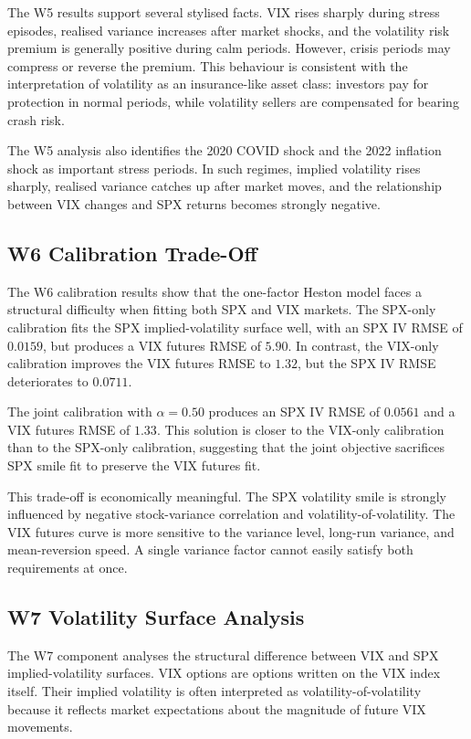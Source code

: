 The W5 results support several stylised facts. VIX rises sharply during stress episodes, realised variance increases after market shocks, and the volatility risk premium is generally positive during calm periods. However, crisis periods may compress or reverse the premium. This behaviour is consistent with the interpretation of volatility as an insurance-like asset class: investors pay for protection in normal periods, while volatility sellers are compensated for bearing crash risk.

The W5 analysis also identifies the 2020 COVID shock and the 2022 inflation shock as important stress periods. In such regimes, implied volatility rises sharply, realised variance catches up after market moves, and the relationship between VIX changes and SPX returns becomes strongly negative.

\subsection{W6 Calibration Trade-Off}

The W6 calibration results show that the one-factor Heston model faces a structural difficulty when fitting both SPX and VIX markets. The SPX-only calibration fits the SPX implied-volatility surface well, with an SPX IV RMSE of \(0.0159\), but produces a VIX futures RMSE of \(5.90\). In contrast, the VIX-only calibration improves the VIX futures RMSE to \(1.32\), but the SPX IV RMSE deteriorates to \(0.0711\).

The joint calibration with \(\alpha=0.50\) produces an SPX IV RMSE of \(0.0561\) and a VIX futures RMSE of \(1.33\). This solution is closer to the VIX-only calibration than to the SPX-only calibration, suggesting that the joint objective sacrifices SPX smile fit to preserve the VIX futures fit.

This trade-off is economically meaningful. The SPX volatility smile is strongly influenced by negative stock-variance correlation and volatility-of-volatility. The VIX futures curve is more sensitive to the variance level, long-run variance, and mean-reversion speed. A single variance factor cannot easily satisfy both requirements at once.

\subsection{W7 Volatility Surface Analysis}

The W7 component analyses the structural difference between VIX and SPX implied-volatility surfaces. VIX options are options written on the VIX index itself. Their implied volatility is often interpreted as volatility-of-volatility because it reflects market expectations about the magnitude of future VIX movements.

